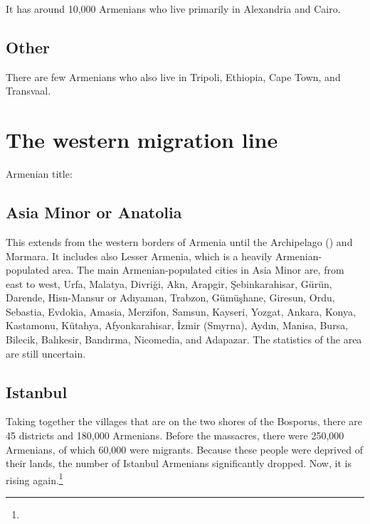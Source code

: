 It has around 10,000 Armenians who live primarily in Alexandria and Cairo. 

\subsection{Other}

There are few Armenians who also live in Tripoli, Ethiopia, Cape Town, and Transvaal. 


\begin{adjarianpage}\label{page:29}\end{adjarianpage}%


\section{The western migration line}

Armenian title: 

\subsection{Asia Minor or Anatolia}

This extends from the western borders of Armenia until the Archipelago () and Marmara. It includes also     Lesser Armenia, which is a heavily Armenian-populated area. The main Armenian-populated cities in Asia Minor are, from east to west, Urfa, Malatya, Divriği, Akn, Arapgir, Şebinkarahisar, Gürün, Darende, Hisn-Mansur or Adıyaman, Trabzon, Gümüşhane, Giresun, Ordu, Sebastia, Evdokia, Amasia, Merzifon, Samsun, Kayseri, Yozgat, Ankara, Konya, Kastamonu, Kütahya, Afyonkarahisar, İzmir (Smyrna), Aydın, Manisa, Bursa, Bilecik, Balıkesir, Bandırma, Nicomedia, and Adapazar. The statistics of the area are still uncertain.

\subsection{Istanbul}

Taking together the villages that are on the two shores of the Bosporus, there are 45 districts and 180,000 Armenians. Before the massacres, there were 250,000 Armenians, of which 60,000 were migrants. Because these people were deprived of their lands, the number of Istanbul Armenians significantly dropped. Now, it is rising again.\footnote{}

